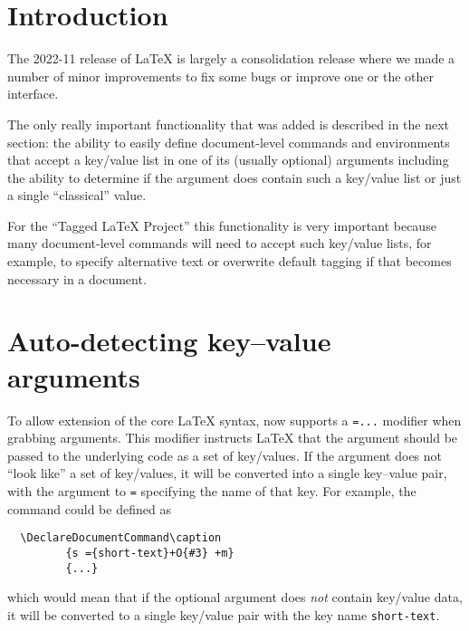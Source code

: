 \documentclass{ltnews}
\providecommand\tubcommand[1]{}
\begin{document}
\tubcommand{\addtolength\textheight{4.2pc}}   %

\maketitle
{  \spaceskip=3.33pt 
\tableofcontents}

\setlength{}


\medskip


\section{Introduction}

The 2022-11 release of \LaTeX{} is largely a consolidation release
where we made a number of minor improvements to fix some bugs or
improve one or the other interface.

The only really important functionality that was added is described in
the next section: the ability to easily define document-level commands
and environments that accept a key/value list in one of its (usually
optional) arguments including the ability to determine if the argument
does contain such a key/value list or just a single
\enquote{classical} value.

For the \enquote{Tagged \LaTeX{} Project} this functionality is very
important because many document-level commands will need to accept
such key/value lists, for example, to specify alternative text or
overwrite default tagging if that becomes necessary in a document.


\section{Auto-detecting key--value arguments}

To allow extension of the core \LaTeX{} syntax,  now supports
a \texttt{={...}} modifier when grabbing arguments. This modifier instructs
\LaTeX{} that the argument should be passed to the underlying code as
a set of key/values. If the argument does not \enquote{look like} a set
of key/values, it will be converted into a single key--value pair, with
the argument to \texttt{=} specifying the name of that key. For
example, the  command could be defined as
\begin{verbatim}
  \DeclareDocumentCommand\caption
         {s ={short-text}+O{#3} +m}
         {...}
\end{verbatim}
which would mean that if the optional argument does \emph{not}
contain key/value data, it will be converted to a single key/value
pair with the key name \texttt{short-text}.
\end{document}

